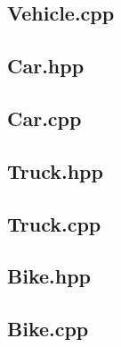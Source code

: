 \documentclass[12pt,naustrian,a4widepaper]{scrartcl}
\begin{document}
\subsection{Vehicle.cpp}


\subsection{Car.hpp}


\subsection{Car.cpp}


\subsection{Truck.hpp}


\subsection{Truck.cpp}


\subsection{Bike.hpp}


\subsection{Bike.cpp}


%


\end{document}
